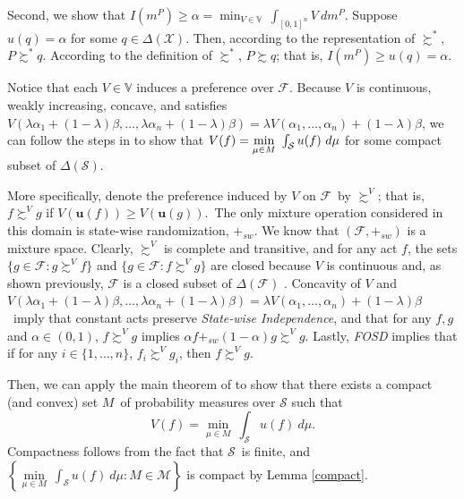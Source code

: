 \documentclass[12pt, notitlepage]{article}
\begin{document}
Second, we show that $I(m^{P})\geq \alpha =\min_{V\in \mathbb{V}%
}~\int_{[0,1]^{n}}V~dm^{P}$. Suppose $u(q)=\alpha $ for some $q\in \Delta (%
\mathcal{X})$. Then, according to the representation of $\succsim ^{\ast }$, 
$P\succsim ^{\ast }q$. According to the definition of $\succsim ^{\ast }$, $%
P\succsim q$; that is, $I(m^{P})\geq u(q)=\alpha $.

{Notice that each $V\in \mathbb{V}$ induces a preference over $\mathcal{F}$.
Because $V$ is continuous, weakly increasing, concave,} and satisfies $%
V(\lambda \alpha _{1}+(1-\lambda )\beta ,\dots ,\lambda \alpha
_{n}+(1-\lambda )\beta )=\lambda V(\alpha _{1},\dots ,\alpha
_{n})+(1-\lambda )\beta ${, we can follow the steps in \cite%
{GilboaSchmeidler89} to show that }$V(f)=\underset{\mu \in M}{\min }~\int_{%
\mathcal{S}}u(f)~d\mu $ for some compact subset of $\Delta (\mathcal{S})${.}

More specifically, {denote the preference induced by }$V$ on $\mathcal{F}${\
by} $\succsim ^{V}$; that is, $f\succsim ^{V}g$ if $V(\mathbf{u}(f))\geq V(%
\mathbf{u}(g))$.{\ The only mixture operation considered in this domain is
state-wise randomization, $+_{sw}$. We know that $(\mathcal{F},+_{sw})$ is a
mixture space. Clearly,} $\succsim ^{V}$ {is complete and transitive, and
for any act $f$, the sets $\{g\in \mathcal{F}:g\succsim ^{V}f\}$ and $\{g\in 
\mathcal{F}:f\succsim ^{V}g\}$ are closed because }$V$ is continuous and, as
shown previously, $\mathcal{F}$ is a closed subset of $\Delta (\mathcal{F})${%
. Concavity of }$V$ and $V(\lambda \alpha _{1}+(1-\lambda )\beta ,\dots
,\lambda \alpha _{n}+(1-\lambda )\beta )=\lambda V(\alpha _{1},\dots ,\alpha
_{n})+(1-\lambda )\beta ${\ imply that constant acts preserve \textit{%
State-wise Independence}, and that for any $f,g$ and $\alpha \in (0,1)$, }$%
f\succsim ^{V}g$ {implies $\alpha f+_{sw}(1-\alpha )$}$g\succsim ^{V}g${.
Lastly, \textit{FOSD} implies that if for any }$i\in \{1,\dots ,n\}$, $%
f_{i}\succsim ^{V}g_{i}$, then $f\succsim ^{V}g$.

{Then, we can apply the main theorem of \cite{GilboaSchmeidler89} to show
that there exists a compact (and convex) set }$M${\ of probability measures
over $\mathcal{S}$ such that%
\begin{equation*}
V(f)=\underset{\mu \in M}{\min }~\int_{\mathcal{S}}u(f)~d\mu .
\end{equation*}%
Compactness follows from the fact that }$\mathcal{S}$\ is finite, and{\ $%
\left\{ \underset{\mu \in M}{\min }~\int_{\mathcal{S}}u(f)~d\mu :M\in 
\mathcal{M}\right\} $ is compact by Lemma \ref{compact}.}
\end{document}
